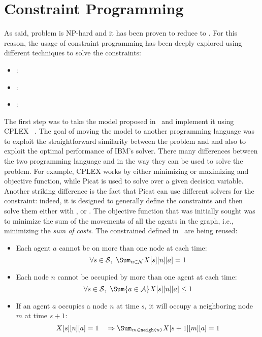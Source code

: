 \section{Constraint Programming}
As said,  problem is NP-hard and it has been proven to reduce to
. For this reason, the usage of constraint programming has been
deeply explored using different techniques to solve the constraints:
\begin{itemize}
  \item {}: 
  \item {}:
  \item {}:
\end{itemize}

The first step was to take the model proposed in~\cite{picat1} and implement it
using CPLEX ~\cite{OPL}. The goal of moving the model to another
programming language was to exploit the straightforward similarity between the
problem and  and also to exploit the optimal performance of IBM's 
solver. \newline
There many differences between the two programming language and in the way they
can be used to solve the problem. For example, CPLEX works by either
minimizing or maximizing and objective function, while Picat is used to solve
over a given decision variable. Another striking difference is the fact that
Picat can use different solvers for the constraint: indeed, it is designed to
generally define the constraints and then solve them either with ,
 or . \newline 
The objective function that was initially sought was to minimize the sum of the
movements of all the agents in the graph, i.e., minimizing the \textit{sum of 
costs}. The constrained defined in~\cite{picat1} are being reused:
\begin{itemize}
  \item Each agent $a$ cannot be on more than one node at each time:
    \begin{equation}
      \forall s \in \mathcal{S},~\Sum_{n \in \mathcal{N}} X[s][n][a]=1
      \label{eq:picat1_one_agent_one_node}
    \end{equation}
  \item Each node $n$ cannot be occupied by more than one agent at each time:
    \begin{equation}
      \forall s \in \mathcal{S},~\Sum{a \in \mathcal{A}} X[s][n][a]\leq 1
      \label{eq:picat1_one_node_one_agent}
    \end{equation}
  \item If an agent $a$ occupies a node $n$ at time $s$, it will occupy a
    neighboring node $m$ at time $s+1$:
    \begin{equation}
      X[s][n][a]=1 \quad \Rightarrow \Sum_{m\in \neigh{n}} X[s+1][m][a]=1
      \label{eq:picat1_move_to_neigh}
    \end{equation}
\end{itemize}
